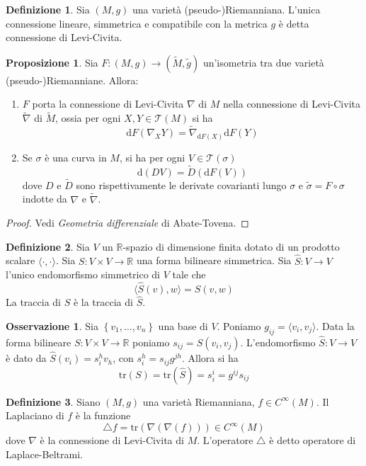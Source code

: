 \documentclass[a4paper,11pt]{article}
\theoremstyle{definition}
\newtheorem{osservazione}{Osservazione}[section]
\newtheorem{definizione}{Definizione}[section]
\theoremstyle{theorem}
\newtheorem{proposizione}{Proposizione}[section]
\newcommand{\dif}{\mathrm{d}}
\newcommand{\R}{\mathbb{R}}
\newcommand{\T}{\mathcal{T}}
\newcommand{\tr}{\textrm{tr}}
\begin{document}
\begin{definizione}
	Sia $(M,g)$ una varietà (pseudo-)Riemanniana. L'unica connessione lineare, simmetrica e compatibile con la metrica $g$ è detta connessione di Levi-Civita.
\end{definizione}
\begin{proposizione}
	Sia $F\colon(M,g)\to(\tilde{M},\tilde{g})$ un'isometria tra due varietà (pseudo-)Riemanniane. Allora:
	\begin{enumerate}
		\item $F$ porta la connessione di Levi-Civita $\nabla$ di $M$ nella connessione di Levi-Civita $\tilde{\nabla}$ di $\tilde{M}$, ossia per ogni $X,Y\in\T(M)$ si ha
		\[\dif F\left(\nabla_XY\right)=\tilde{\nabla}_{\dif F(X)}\dif F(Y)\]
		\item Se $\sigma$ è una curva in $M$, si ha per ogni $V\in\T(\sigma)$
		\[\dif\left(DV\right)=\tilde{D}\left(\dif F(V)\right)\]
		dove $D$ e $\tilde{D}$ sono rispettivamente le derivate covarianti lungo $\sigma$ e $\tilde{\sigma}=F\circ\sigma$ indotte da $\nabla$ e $\tilde{\nabla}$.
	\end{enumerate}
\end{proposizione}
\begin{proof}
	Vedi \textit{Geometria differenziale} di Abate-Tovena.
\end{proof}
\begin{definizione}
	Sia $V$ un $\R$-spazio di dimensione finita dotato di un prodotto scalare $\langle\cdot,\cdot\rangle$. Sia $S\colon V\times V\to\R$ una forma bilineare simmetrica. Sia $\hat{S}\colon V\to V$ l'unico endomorfismo simmetrico di $V$ tale che
	\[\langle\hat{S}(v),w\rangle=S(v,w)\]
	La traccia di $S$ è la traccia di $\hat{S}$.
\end{definizione}
\begin{osservazione}
	Sia $\left\{v_1,\dots,v_n\right\}$ una base di $V$. Poniamo $g_{ij}=\langle v_i,v_j\rangle$. Data la forma bilineare $S\colon V\times V\to\R$ poniamo $s_{ij}=S(v_i,v_j)$. L'endomorfismo $\hat{S}\colon V\to V$ è dato da $\hat{S}(v_i)=s_{i}^hv_h$, con $s_i^h=s_{ij}g^{jh}$. Allora si ha
	\[\textrm{tr}(S)=\textrm{tr}(\hat{S})=s^i_i=g^{ij}s_{ij}\]
\end{osservazione}
\begin{definizione}
	Siano $(M,g)$ una varietà Riemanniana, $f\in C^\infty(M)$. Il Laplaciano di $f$ è la funzione
	\[\triangle f=\tr\left(\nabla\left(\nabla(f)\right)\right)\in C^\infty(M)\]
	dove $\nabla$ è la connessione di Levi-Civita di $M$. L'operatore $\triangle$ è detto operatore di Laplace-Beltrami.
\end{definizione}
\end{document}

